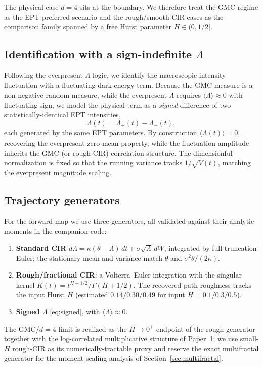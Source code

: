 \documentclass[11pt,a4paper]{article}
\begin{document}
The physical case $d=4$ sits at the boundary. We therefore treat the GMC regime as the EPT-preferred scenario and the rough/smooth CIR cases as the comparison family spanned by a free Hurst parameter $H\in(0,1/2]$.

\subsection{Identification with a sign-indefinite $\Lambda$}

Following the everpresent-$\Lambda$ logic, we identify the macroscopic intensity fluctuation with a fluctuating dark-energy term. Because the GMC measure is a non-negative random measure, while the everpresent-$\Lambda$ requires $\langle\Lambda\rangle\approx 0$ with fluctuating sign, we model the physical term as a \emph{signed} difference of two statistically-identical EPT intensities,
\begin{equation}
\Lambda(t) = \Lambda_+(t) - \Lambda_-(t),
\label{eq:signed}
\end{equation}
each generated by the same EPT parameters. By construction $\langle\Lambda(t)\rangle = 0$, recovering the everpresent zero-mean property, while the fluctuation amplitude inherits the GMC (or rough-CIR) correlation structure. The dimensionful normalization is fixed so that the running variance tracks $1/\sqrt{V(t)}$, matching the everpresent magnitude scaling.

\subsection{Trajectory generators}

For the forward map we use three generators, all validated against their analytic moments in the companion code:
\begin{enumerate}
\item \textbf{Standard CIR} $d\Lambda = \kappa(\theta-\Lambda)\,dt + \sigma\sqrt{\Lambda}\,dW$, integrated by full-truncation Euler; the stationary mean and variance match $\theta$ and $\sigma^2\theta/(2\kappa)$.
\item \textbf{Rough/fractional CIR}: a Volterra--Euler integration with the singular kernel $K(t)=t^{H-1/2}/\Gamma(H+1/2)$. The recovered path roughness tracks the input Hurst $H$ (estimated $0.14/0.30/0.49$ for input $H=0.1/0.3/0.5$).
\item \textbf{Signed $\Lambda$} \eqref{eq:signed}, with $\langle\Lambda\rangle\approx 0$.
\end{enumerate}
The GMC/$d=4$ limit is realized as the $H\to 0^+$ endpoint of the rough generator together with the log-correlated multiplicative structure of Paper~1; we use small-$H$ rough-CIR as its numerically-tractable proxy and reserve the exact multifractal generator for the moment-scaling analysis of Section~\ref{sec:multifractal}.
\end{document}
